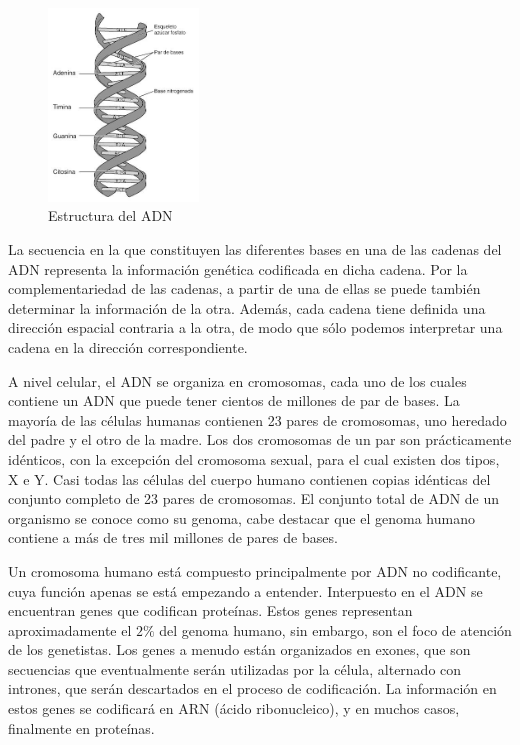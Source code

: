\begin{figure}[H]
    \centering
    \includegraphics[width=4cm]{img/Estructura_del_ADN.jpg}
    \caption{Estructura del ADN}
\end{figure}

La secuencia en la que constituyen las diferentes bases en una de las cadenas del ADN representa la información genética codificada en dicha cadena. Por la complementariedad de las cadenas, a partir de una de ellas se puede también determinar la información de la otra. Además, cada cadena tiene definida una dirección espacial contraria a la otra, de modo que sólo podemos interpretar una cadena en la dirección correspondiente.

A nivel celular, el ADN se organiza en cromosomas, cada uno de los cuales contiene un ADN que puede tener cientos de millones de par de bases. La mayoría de las células humanas contienen 23 pares de cromosomas, uno heredado del padre y el otro de la madre. Los dos cromosomas de un par son prácticamente idénticos, con la excepción del cromosoma sexual, para el cual existen dos tipos, X e Y. Casi todas las células del cuerpo humano contienen copias idénticas del conjunto completo de 23 pares de cromosomas. El conjunto total de ADN de un organismo se conoce como su genoma, cabe destacar que el genoma humano contiene a más de tres mil millones de pares de bases.

Un cromosoma humano está compuesto principalmente por ADN no codificante, cuya función apenas se está empezando a entender. Interpuesto en el ADN se encuentran genes que codifican proteínas. Estos genes representan aproximadamente el $2\%$ del genoma humano, sin embargo, son el foco de atención de los genetistas. Los genes a menudo están organizados en exones, que son secuencias que eventualmente serán utilizadas por la célula, alternado con intrones, que serán descartados en el proceso de codificación. La información en estos genes se codificará en ARN (ácido ribonucleico), y en muchos casos, finalmente en proteínas.

